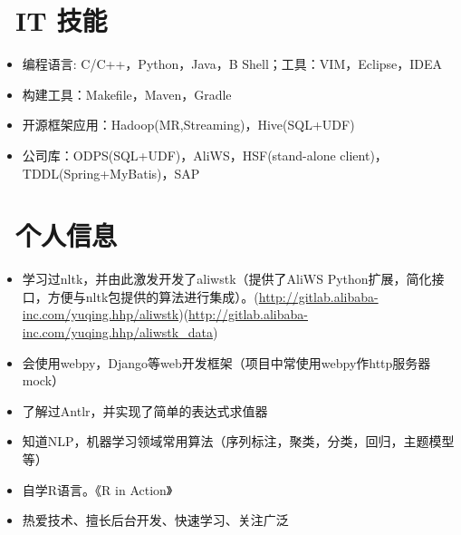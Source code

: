 \documentclass{resume}
\begin{document}
\section{\faCogs\ IT 技能}
\begin{itemize}[parsep=0.5ex]
  \item 编程语言: C/C++，Python，Java，B Shell；工具：VIM，Eclipse，IDEA
  \item 构建工具：Makefile，Maven，Gradle
  \item 开源框架应用：Hadoop(MR,Streaming)，Hive(SQL+UDF)
  \item 公司库：ODPS(SQL+UDF)，AliWS，HSF(stand-alone client)，TDDL(Spring+MyBatis)，SAP
\end{itemize}


\section{\faInfo\ 个人信息}
\begin{itemize}[parsep=0.5ex]
  \item 学习过nltk，并由此激发开发了aliwstk（提供了AliWS Python扩展，简化接口，方便与nltk包提供的算法进行集成）。(\url{http://gitlab.alibaba-inc.com/yuqing.hhp/aliwstk})(\url{http://gitlab.alibaba-inc.com/yuqing.hhp/aliwstk_data})
  \item 会使用webpy，Django等web开发框架（项目中常使用webpy作http服务器mock）
  \item 了解过Antlr，并实现了简单的表达式求值器
  \item 知道NLP，机器学习领域常用算法（序列标注，聚类，分类，回归，主题模型等）
  \item 自学R语言。《R in Action》
  \item 热爱技术、擅长后台开发、快速学习、关注广泛
\end{itemize}

%
%
\end{document}
